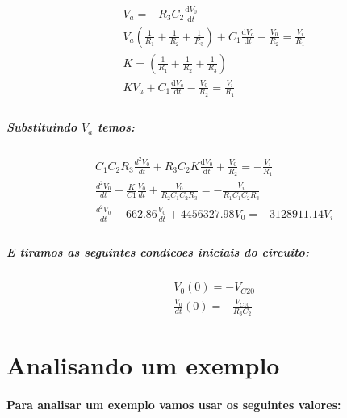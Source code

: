 \documentclass[12pt,twoside, a4paper, twocolumn]{article}
\newcommand\deriv[2]{\frac{\mathrm d #1}{\mathrm d #2}}
\begin{document}
\begin{equation}
    \begin{aligned}
         & V_a = - R_3 C_2 \deriv{V_0}{t}                                                                                          \\
         & V_a \left(\frac{1}{R_1} + \frac{1}{R_2} + \frac{1}{R_3}\right) + C_1 \deriv{V_a}{t} - \frac{V_0}{R_2} = \frac{V_i}{R_1} \\
         & K = \left(\frac{1}{R_1} + \frac{1}{R_2} + \frac{1}{R_3}\right)                                                          \\
         & K V_a  + C_1 \deriv{V_a}{t} - \frac{V_0}{R_2} =\frac{V_i}{R_1}                                                          \\
    \end{aligned}
\end{equation}

\subparagraph*{Substituindo $V_a$ temos:}

\begin{equation}
    \begin{aligned}
         & C_1 C_2 R_3 \frac{d^2 V_0}{dt} + R_3 C_2 K \deriv{V_0}{t}    + \frac{V_0}{R_2} = -\frac{V_i}{R_1}              \\
         & \frac{d^2 V_0}{dt} + \frac{K}{C1} \frac{V_0}{dt} + \frac{V_0}{R_2 C_1 C_2 R_3} = - \frac{V_i}{R_1 C_1 C_2 R_3} \\
         & \frac{d^2 V_0}{dt} + 662.86 \frac{V_0}{dt} + 4456327.98 V_0 = - 3128911.14 V_i                                 \\
    \end{aligned}
\end{equation}

\subparagraph*{E tiramos as seguintes condicoes iniciais do circuito:}

\begin{equation}
    \begin{aligned}
         & V_0(0)  = - V_{C20}                          \\
         & \frac{V_0}{dt}(0) = -\frac{V_{C10}}{R_3 C_2}
    \end{aligned}
\end{equation}

\section{Analisando um exemplo}

\paragraph*{Para analisar um exemplo vamos usar os seguintes valores:}
\end{document}
